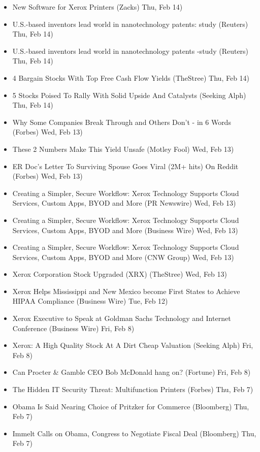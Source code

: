 \documentclass[11pt,asymmetric]{article}
\begin{document}
\begin{itemize}
\item New Software for Xerox Printers (Zacks) Thu, Feb 14)
\item U.S.-based inventors lead world in nanotechnology patents: study (Reuters) Thu, Feb 14)
\item U.S.-based inventors lead world in nanotechnology patents -study (Reuters) Thu, Feb 14)
\item 4 Bargain Stocks With Top Free Cash Flow Yields (TheStree) Thu, Feb 14)
\item 5 Stocks Poised To Rally With Solid Upside And Catalysts (Seeking Alph) Thu, Feb 14)
\item Why Some Companies Break Through and Others Don't - in 6 Words (Forbes) Wed, Feb 13)
\item These 2 Numbers Make This Yield Unsafe (Motley Fool) Wed, Feb 13)
\item ER Doc's Letter To Surviving Spouse Goes Viral (2M+ hits) On Reddit (Forbes) Wed, Feb 13)
\item Creating a Simpler, Secure Workflow: Xerox Technology Supports Cloud Services, Custom Apps, BYOD and More (PR Newswire) Wed, Feb 13)
\item Creating a Simpler, Secure Workflow: Xerox Technology Supports Cloud Services, Custom Apps, BYOD and More (Business Wire) Wed, Feb 13)
\item Creating a Simpler, Secure Workflow: Xerox Technology Supports Cloud Services, Custom Apps, BYOD and More (CNW Group) Wed, Feb 13)
\item Xerox Corporation Stock Upgraded (XRX) (TheStree) Wed, Feb 13)
\item Xerox Helps Mississippi and New Mexico become First States to Achieve HIPAA Compliance (Business Wire) Tue, Feb 12)
\item Xerox Executive to Speak at Goldman Sachs Technology and Internet Conference (Business Wire) Fri, Feb 8)
\item Xerox: A High Quality Stock At A Dirt Cheap Valuation (Seeking Alph) Fri, Feb 8)
\item Can Procter \& Gamble CEO Bob McDonald hang on? (Fortune) Fri, Feb 8)
\item The Hidden IT Security Threat: Multifunction Printers (Forbes) Thu, Feb 7)
\item Obama Is Said Nearing Choice of Pritzker for Commerce (Bloomberg) Thu, Feb 7)
\item Immelt Calls on Obama, Congress to Negotiate Fiscal Deal (Bloomberg) Thu, Feb 7)

\end{itemize}
\end{document}
